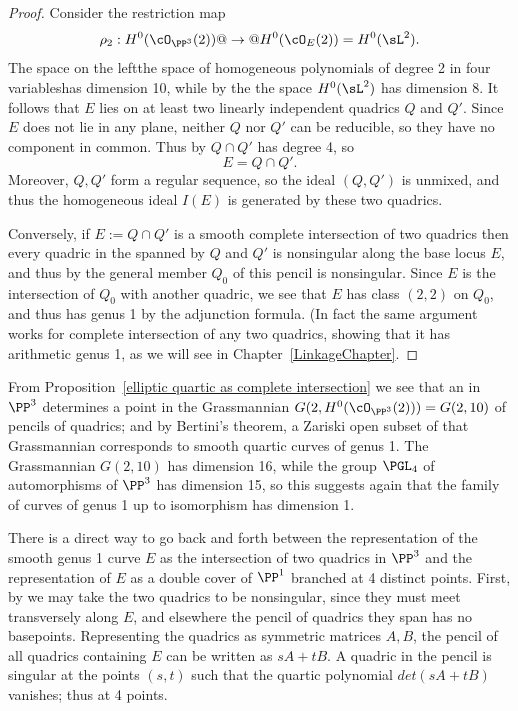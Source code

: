 \begin{proof}
Consider the restriction map
$$
\rho_2  : H^0(\cO_{\PP^3}(2)) @ \to @ H^0(\cO_{E}(2)) = H^0(\sL^2).
$$
The space on the left\emdash the space of homogeneous polynomials of
degree 2 in four variables\emdash has dimension 10, while by the 
%
the space $H^0(\sL^2)$ has dimension 8. It follows that $E$ lies on at least two linearly independent quadrics $Q$ and $Q'$. Since $E$ does not lie in any plane, neither $Q$ nor $Q'$ can be reducible, so they have no component in common.
Thus by 
%
$Q \cap Q' $ has degree 4, so
$$
E =Q \cap Q'.
$$
%
Moreover, $Q,Q'$ form a regular sequence, so the ideal $(Q,Q')$ is unmixed, and thus the homogeneous ideal $I(E)$ is generated by
these two quadrics. 

Conversely, if $E := Q\cap Q'$ is a smooth complete intersection of
two quadrics then  every quadric in the 
%
spanned by $Q$ and $Q'$ is nonsingular along the base locus $E$, and
thus by 
%
the general member $Q_0$ of this
pencil is nonsingular. Since $E$ is the intersection of $Q_0$ with another quadric, we see that $E$ has class $(2,2)$ on $Q_0$,
and thus has genus 1 by the adjunction formula. (In fact the same argument works for complete intersection of any two quadrics,
showing that it has arithmetic genus 1, as we will see in Chapter~\ref{LinkageChapter}.
\end{proof}

From Proposition~\ref{elliptic quartic as complete intersection} 
we see that an 
%
in $\PP^3$
determines a point in the Grassmannian 
%
$G(2, H^0(\cO_{\PP^3}(2))) =
G(2, 10)$ of pencils of quadrics; and by Bertini's theorem, a Zariski
open subset of that Grassmannian corresponds to smooth quartic curves
of genus 1. The Grassmannian $G(2,10)$ has dimension 16, while the
group $\PGL_4$ of automorphisms of $\PP^3$ has dimension 15, so this
suggests again that the family of curves of genus 1 up to isomorphism
has dimension 1.

There is a direct way to go back and forth between the representation of the smooth genus 1 curve $E$ as the intersection of two quadrics in $\PP^3$ and the representation of $E$ as a double cover
of $\PP^1$ branched at 4 distinct points. First, by 
%
we may take the two quadrics to be nonsingular, since they must meet
transversely along $E$, and elsewhere the
pencil of quadrics they span has no basepoints. Representing the quadrics as symmetric matrices $A,B$, the pencil of all quadrics containing $E$ can be 
written as $sA+tB$. A quadric in the pencil is singular at the points $(s,t)$ such that the quartic polynomial $det(sA+tB)$ vanishes; thus at 4 points.

